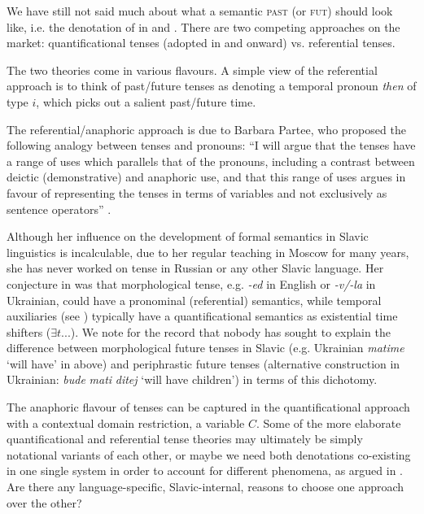 \documentclass[output=paper,colorlinks,citecolor=brown]{langscibook}
\begin{document}
We have still not said much about what a semantic \textsc{past} (or \textsc{fut}) should look like, i.e. the denotation of   in  and .
There are two  competing approaches on the market: quantificational tenses (adopted in  and onward) vs.  referential tenses.

The two theories come in various flavours. A simple view of the referential approach is to think of past/future tenses as denoting a temporal pronoun {\textit{then}} of type $i$, which picks out a salient past/future time. 

The referential/anaphoric approach is due to Barbara Partee, who proposed the following analogy between tenses and pronouns: ``I will argue that the
tenses have a range of uses which parallels that of the pronouns, including a
contrast between deictic (demonstrative) and anaphoric use, and that this range
of uses argues in favour of representing the tenses in terms of variables and not
exclusively as sentence operators'' \citep[601]{Partee1973}. 

Although her influence on the development of formal semantics in Slavic linguistics is incalculable,  due to her regular teaching in Moscow for many years, she has never worked on tense in Russian or any other Slavic language. Her conjecture in \citet{Partee1973} was that morphological tense, e.g. {\textit{-ed}} in English or {\textit{-v/-la}} in Ukrainian, could have a pronominal (referential) semantics, while temporal auxiliaries (see ) typically have a quantificational semantics as existential time shifters ($\exists t...$).
We note for the record that nobody has sought to explain the difference between morphological future tenses in Slavic (e.g. Ukrainian \textit{matime} `will have' in  above) and periphrastic future tenses (alternative construction in Ukrainian: \textit{bude} \textit{mati} \textit{ditej} `will have children') in terms of this dichotomy. 

The anaphoric flavour of tenses can be captured in the quantificational approach with a contextual domain restriction, a variable $C$. Some of the more elaborate quantificational and referential tense theories may ultimately be simply notational variants of each other, or maybe we need both denotations co-existing in one single system in order to account for different phenomena, as  argued in \citet{Groenn2015}. Are there any language-specific, Slavic-internal, reasons to choose one approach over the other?
\end{document}

